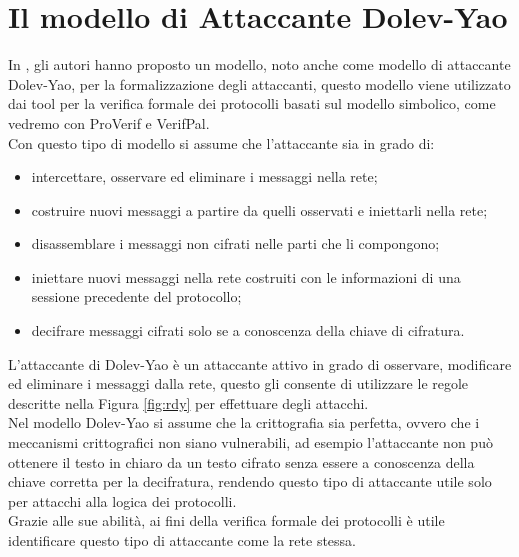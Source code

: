 \section{Il modello di Attaccante Dolev-Yao}\label{sec:dy}

In \cite{DY83}, gli autori hanno proposto un modello, noto anche come modello di attaccante Dolev-Yao, per la formalizzazione degli attaccanti, questo modello viene utilizzato dai tool per la verifica formale dei protocolli basati sul modello simbolico, come vedremo con ProVerif e VerifPal.\\
Con questo tipo di modello si assume che l'attaccante sia in grado di:

\begin{itemize}
    \item intercettare, osservare ed eliminare i messaggi nella rete;
    \item costruire nuovi messaggi a partire da quelli osservati e iniettarli nella rete;
    \item disassemblare i messaggi non cifrati nelle parti che li compongono;
    \item iniettare nuovi messaggi nella rete costruiti con le informazioni di una sessione precedente del protocollo;
    \item decifrare messaggi cifrati solo se a conoscenza della chiave di cifratura.
\end{itemize}

\noindent L'attaccante di Dolev-Yao è un attaccante attivo in grado di osservare, modificare ed eliminare i messaggi dalla rete, questo gli consente di utilizzare le regole descritte nella Figura \ref{fig:rdy} per effettuare degli attacchi.\\
Nel modello Dolev-Yao si assume che la crittografia sia perfetta, ovvero che i meccanismi crittografici non siano vulnerabili, ad esempio l'attaccante non può ottenere il testo in chiaro da un testo cifrato senza essere a conoscenza della chiave corretta per la decifratura, rendendo questo tipo di attaccante utile solo per attacchi alla logica dei protocolli.\\ 
Grazie alle sue abilità, ai fini della verifica formale dei protocolli è utile identificare questo tipo di attaccante come la rete stessa.

